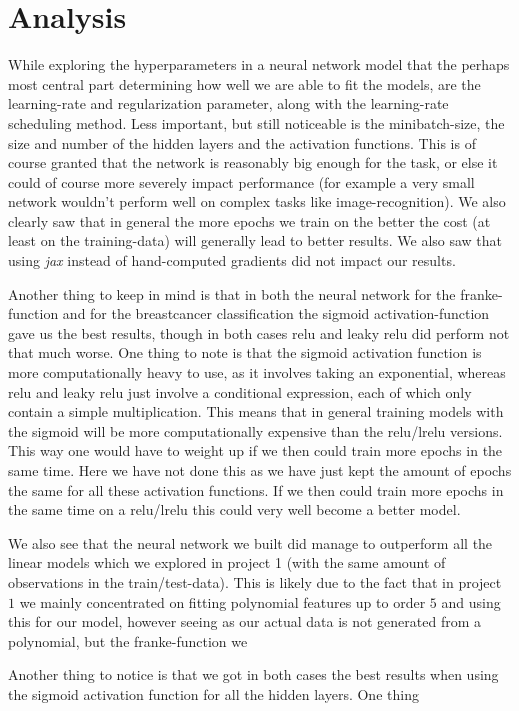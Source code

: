 \documentclass{article}
\begin{document}
\section{Analysis}
While exploring the hyperparameters in a neural network model that the perhaps
most central part determining how well we are able to fit the models, are the
learning-rate and regularization parameter, along with the learning-rate
scheduling method. Less important, but still noticeable is the minibatch-size,
the size and number of the hidden layers and the activation functions. This is
of course granted that the network is reasonably big enough for the task, or else
it could of course more severely impact performance (for example a very small
network wouldn't perform well on complex tasks like image-recognition). We also
clearly saw that in general the more epochs we train on the better the cost (at
least on the training-data) will generally lead to better results. We also saw
that using \textit{jax} instead of hand-computed gradients did not impact our
results.

Another thing to keep in mind is that in both the neural network for the
franke-function and for the breastcancer classification the sigmoid
activation-function gave us the best results, though in both cases relu and
leaky relu did perform not that much worse. One thing to note is that the
sigmoid activation function is more computationally heavy to use, as it involves
taking an exponential, whereas relu and leaky relu just involve a conditional
expression, each of which only contain a simple multiplication. This means that
in general training models with the sigmoid will be more computationally
expensive than the relu/lrelu versions. This way one would have to weight up if
we then could train more epochs in the same time. Here we have not done this as
we have just kept the amount of epochs the same for all these activation
functions. If we then could train more epochs in the same time on a relu/lrelu
this could very well become a better model.

We also see that the neural network we built did manage to outperform all the
linear models which we explored in project 1 (with the same amount of
observations in the train/test-data). This is likely due to the fact that in
project $1$ we mainly concentrated on fitting polynomial features up to order
$5$ and using this for our model, however seeing as our actual data is not
generated from a polynomial, but the franke-function we

Another thing to notice is that we got in both cases the best results when using
the sigmoid activation function for all the hidden layers. One thing
\end{document}
